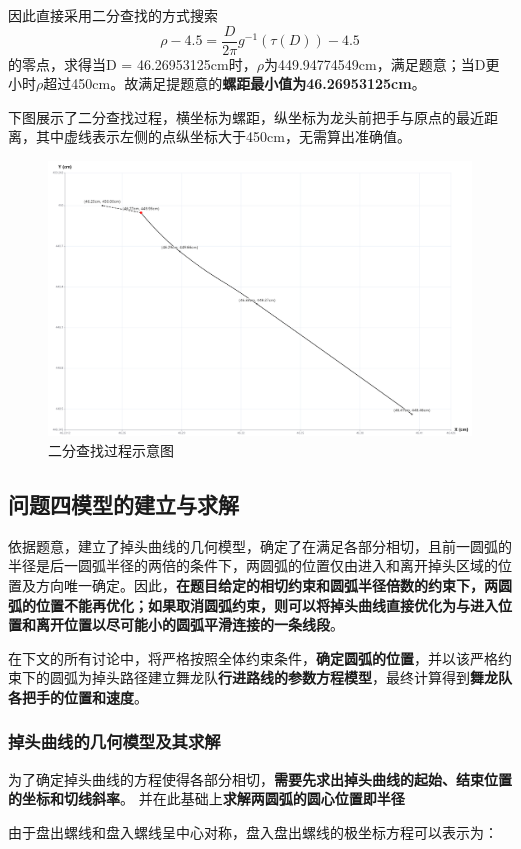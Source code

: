 \documentclass[a4paper]{article}
\begin{document}
        因此直接采用二分查找的方式搜索$$\rho -4.5 = \frac{D}{2 \pi} g^{-1}(\tau(D)) - 4.5$$的零点，求得当D = 46.26953125cm时，$\rho$为449.94774549cm，满足题意；当D更小时$\rho$超过450cm。故满足提题意的\textbf{螺距最小值为46.26953125cm}。

        下图展示了二分查找过程，横坐标为螺距，纵坐标为龙头前把手与原点的最近距离，其中虚线表示左侧的点纵坐标大于450cm，无需算出准确值。
 \begin{figure}[h]
     \centering
     \includegraphics[width=0.5\linewidth]{image/search_3.png}
     \caption{二分查找过程示意图}
     \label{fig:enter-label}
 \end{figure}
	\subsection{问题四模型的建立与求解}

		依据题意，建立了掉头曲线的几何模型，确定了在满足各部分相切，且前一圆弧的半径是后一圆弧半径的两倍的条件下，两圆弧的位置仅由进入和离开掉头区域的位置及方向唯一确定。因此，\textbf{在题目给定的相切约束和圆弧半径倍数的约束下，两圆弧的位置不能再优化；如果取消圆弧约束，则可以将掉头曲线直接优化为与进入位置和离开位置以尽可能小的圆弧平滑连接的一条线段}。

        在下文的所有讨论中，将严格按照全体约束条件，\textbf{确定圆弧的位置}，并以该严格约束下的圆弧为掉头路径建立舞龙队\textbf{行进路线的参数方程模型}，最终计算得到\textbf{舞龙队各把手的位置和速度}。%

		\subsubsection{掉头曲线的几何模型及其求解}

		为了确定掉头曲线的方程使得各部分相切，\textbf{需要先求出掉头曲线的起始、结束位置的坐标和切线斜率}。
		并在此基础上\textbf{求解两圆弧的圆心位置即半径}

		由于盘出螺线和盘入螺线呈中心对称，盘入盘出螺线的极坐标方程可以表示为：
\end{document}
